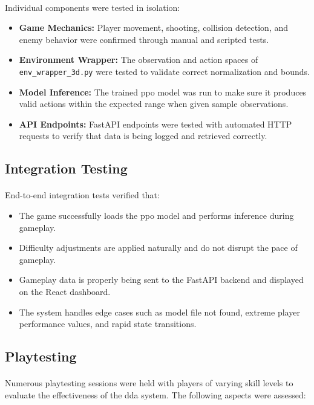 \paragraph{} Individual components were tested in isolation:

\begin{itemize}
	\item \textbf{Game Mechanics:} Player movement, shooting, collision detection, and enemy behavior were confirmed through manual and scripted tests.
	\item \textbf{Environment Wrapper:} The observation and action spaces of \texttt{env\_wrapper\_3d.py} were tested to validate correct normalization and bounds.
	\item \textbf{Model Inference:} The trained \ac{ppo} model was run to make sure it produces valid actions within the expected range when given sample observations.
	\item \textbf{API Endpoints:} FastAPI endpoints were tested with automated HTTP requests to verify that data is being logged and retrieved correctly.
\end{itemize}

\subsection{Integration Testing}
\paragraph{} End-to-end integration tests verified that:

\begin{itemize}
	\item The game successfully loads the \ac{ppo} model and performs inference during gameplay.
	\item Difficulty adjustments are applied naturally and do not disrupt the pace of gameplay.
	\item Gameplay data is properly being sent to the FastAPI backend and displayed on the React dashboard.
	\item The system handles edge cases such as model file not found, extreme player performance values, and rapid state transitions.
\end{itemize}

\subsection{Playtesting}
\paragraph{} Numerous playtesting sessions were held with players of varying skill levels to evaluate the effectiveness of the \ac{dda} system. The following aspects were assessed:

